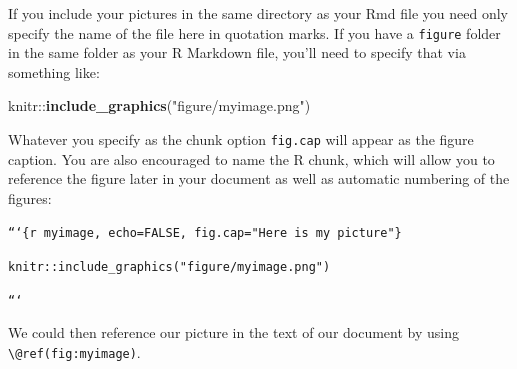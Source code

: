 \documentclass[]{tufte-book}
\newenvironment{Shaded}{\begin{snugshade}}{\end{snugshade}}
\newcommand{\KeywordTok}[1]{\textcolor[rgb]{0.13,0.29,0.53}{\textbf{{#1}}}}
\newcommand{\StringTok}[1]{\textcolor[rgb]{0.31,0.60,0.02}{{#1}}}
\newcommand{\NormalTok}[1]{{#1}}
\begin{document}
If you include your pictures in the same directory as your Rmd file you
need only specify the name of the file here in quotation marks. If you
have a \texttt{figure} folder in the same folder as your R Markdown
file, you'll need to specify that via something like:

\begin{Shaded}
\begin{Highlighting}[]
\NormalTok{knitr::}\KeywordTok{include_graphics}\NormalTok{(}\StringTok{"figure/myimage.png"}\NormalTok{)}
\end{Highlighting}
\end{Shaded}

Whatever you specify as the chunk option \texttt{fig.cap} will appear as
the figure caption. You are also encouraged to name the R chunk, which
will allow you to reference the figure later in your document as well as
automatic numbering of the figures:

\texttt{```\{r\ myimage,\ echo=FALSE,\ fig.cap="Here\ is\ my\ picture"\}}

\texttt{knitr::include\_graphics("figure/myimage.png")}

\texttt{```}

We could then reference our picture in the text of our document by using
\texttt{\textbackslash{}@ref(fig:myimage)}.

\renewcommand{\bibname}{References}

% 
% 
\end{document}
